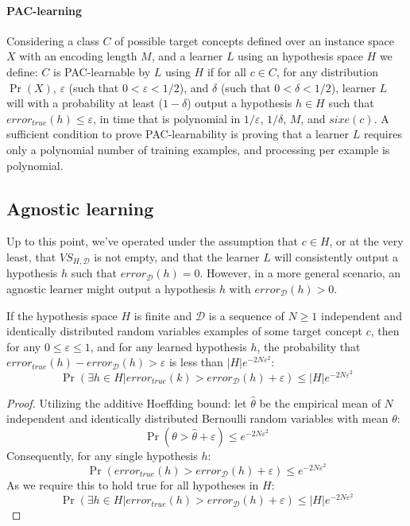 \paragraph*{PAC-learning}
Considering a class $C$ of possible target concepts defined over an instance space $X$ with an encoding length $M$, and a learner $L$ using an hypothesis space $H$ we define: $C$ is PAC-learnable by $L$ using $H$ if for all $c\in C$, for any distribution $\Pr(X)$, $\varepsilon$ (such that $0 < \varepsilon < 1/2$), and $\delta$ (such that $0 < \delta < 1/2$), learner $L$ will with a probability at least ($1 - \delta$) output a hypothesis $h \in H$ such that $error_{true}(h) \leq \varepsilon$, in time that is polynomial in $1/\varepsilon$, $1/\delta$, $M$, and $sixe(c)$.
A sufficient condition to prove PAC-learnability is proving that a learner $L$ requires only a polynomial number of training examples, and processing per example is polynomial.

\subsection{Agnostic learning}
Up to this point, we've operated under the assumption that $c \in H$, or at the very least, that $VS_{H,\mathcal{D}}$ is not empty, and that the learner $L$ will consistently output a hypothesis $h$ such that $error_{\mathcal{D}}(h) = 0$. 
However, in a more general scenario, an agnostic learner might output a hypothesis $h$ with $error_{\mathcal{D}}(h) > 0$.
\begin{theorem}
    If the hypothesis space $H$ is finite and $\mathcal{D}$ is a sequence of $N\geq 1$ independent and identically distributed random variables examples of some target concept $c$, then for any $0 \leq \varepsilon \leq 1$, and for any learned hypothesis $h$, the probability that $error_{true}(h) - error_{\mathcal{D}}(h) > \varepsilon$ is less than $\left\lvert H\right\rvert e^{-2N\varepsilon^2}$:
    \[\Pr(\exists h\in H|error_{true}(k)>error_{\mathcal{D}}(h)+\varepsilon)\leq \left\lvert H\right\rvert e^{-2N\varepsilon^2}\]
\end{theorem}
\begin{proof}
    Utilizing the additive Hoeffding bound: let $\hat{\theta}$ be the empirical mean of $N$ independent and identically distributed Bernoulli random variables with mean $\theta$:
    \[\Pr(\theta>\hat{\theta}+\varepsilon)\leq e^{-2N\varepsilon^2}\]
    Consequently, for any single hypothesis $h$:
    \[\Pr(error_{true}(h)>error_{\mathcal{D}}(h)+\varepsilon)\leq e^{-2N\varepsilon^2}\]
    As we require this to hold true for all hypotheses in $H$:
    \[\Pr(\exists h\in H|error_{true}(h)>error_{\mathcal{D}}(h)+\varepsilon)\leq\left\lvert H\right\rvert e^{-2N\varepsilon^2}\]
\end{proof}

